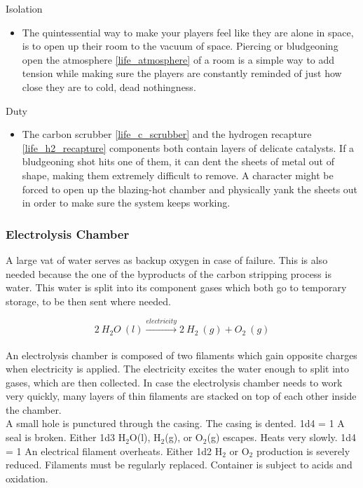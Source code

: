 \documentclass[a4paper]{article}
\begin{document}
\begin{minipage}[t]{0.4\linewidth}
Isolation
\begin{itemize}
\item The quintessential way to make your players feel like they are alone in space, is to open up their room to the vacuum of space. Piercing or bludgeoning open the atmosphere \ref{life_atmosphere} of a room is a simple way to add tension while making sure the players are constantly reminded of just how close they are to cold, dead nothingness.
\end{itemize}
\end{minipage}
\begin{minipage}[t]{0.4\linewidth}
Duty
\begin{itemize}
\item The carbon scrubber \ref{life_c_scrubber} and the hydrogen recapture \ref{life_h2_recapture} components both contain layers of delicate catalysts. If a bludgeoning shot hits one of them, it can dent the sheets of metal out of shape, making them extremely difficult to remove. A character might be forced to open up the blazing-hot chamber and physically yank the sheets out in order to make sure the system keeps working.
\end{itemize}
\end{minipage}

\hspace{-18pt} \subsubsection{Electrolysis Chamber} \label{life_electrolysis} \vspace{-0.2cm}
A large vat of water serves as backup oxygen in case of failure. This is also needed because the one of the byproducts of the carbon stripping process is water. This water is split into its component gases which both go to temporary storage, to be then sent where needed.

\begin{equation}
2\ H_2O\ (l) \xrightarrow[]{electricity} 2\ H_2\ (g) + O_2\ (g) 
\end{equation}

An electrolysis chamber is composed of two filaments which gain opposite charges when electricity is applied. The electricity excites the water enough to split into gases, which are then collected. In case the electrolysis chamber needs to work very quickly, many layers of thin filaments are stacked on top of each other inside the chamber. 
\\ \pbhw
{A small hole is punctured through the casing. \newline {}}
{The casing is dented. \newline 1d4 = 1 A seal is broken. Either 1d3 H$_2$O(l), H$_2$(g), or O$_2$(g) escapes.}
{Heats very slowly. \newline 1d4 = 1 An electrical filament overheats. Either 1d2 H$_2$ or O$_2$ production is severely reduced.}
{Filaments must be regularly replaced. Container is subject to acids and oxidation.}
\end{document}
